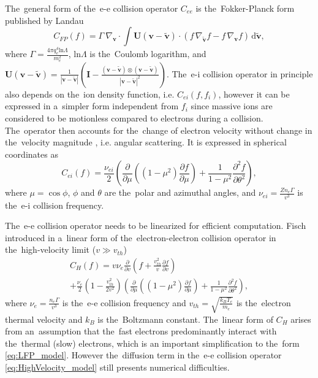 \documentclass[
 aps,
 jmp,
 amsmath,amssymb,
 twocolumn,
]{revtex4-1}
\newcommand{\pdv}[2]{\frac{\partial{#1}}{\partial{#2}}}
\newcommand{\vect}[1]{\boldsymbol{#1}}
\newcommand{\matr}[1]{\mathbf{#1}}
\newcommand{\dI}{\text{d}}
\newcommand{\Zbar}{Z}
\newcommand{\nue}{\nu_{e}}
\newcommand{\nuei}{\nu_{ei}}
\newcommand{\vmag}{v}
\newcommand{\vth}{v_{th}}
\newcommand{\qe}{q_e}
\newcommand{\me}{m_e}
\newcommand{\kB}{k_B}
\newcommand{\vv}{\vect{v}}
\newcommand{\vvb}{\tilde{\vect{v}}}
\newcommand{\gv}{\nabla_{\vv}}
\newcommand{\gvb}{\nabla_{\vvb}}
\newcommand{\ft}{f}
\newcommand{\lnc}{\text{ln}\Lambda}
\begin{document}
The~general form of the~e-e collision operator 
$C_{ee}$ is the~Fokker-Planck form published by Landau \cite{Landau_1936}
\begin{equation}
  C_{FP}(\ft) =
  \Gamma~\gv\cdot\int \matr{U}(\vv - \vvb) \cdot \left(
  \ft\, \gvb \ft - \ft\, \gv \ft \right)\, \dI\vvb ,
  \label{eq:LFP_model}
\end{equation}
where $\Gamma = \frac{4\pi\qe^4\lnc}{\me^2}$, $\lnc$ is the~Coulomb logarithm,
and $\matr{U}(\vv - \vvb) = \frac{1}{|\vv - \vvb|}\left(\matr{I} - \frac{(\vv - \vvb)\otimes (\vv - \vvb)}{|\vv - \vvb|^2}\right)$.
The~e-i collision operator in principle also depends 
on the~ion density function, i.e. $C_{ei}(\ft, \ft_i)$, however it 
can be expressed in a~simpler form independent from $\ft_i$
since massive ions are considered 
to be motionless compared to electrons during a collision. 
The~operator then accounts
for the~change of electron velocity without change in the~velocity magnitude
, i.e. angular scattering. 
It is expressed in spherical coordinates as
\begin{equation}
  C_{ei}(\ft) = \frac{\nuei}{2}
  \left(\pdv{}{\mu}\left((1 - \mu^2)\pdv{\ft}{\mu}\right)
  + \frac{1}{1 - \mu^2}\frac{\partial^2 \ft}{\partial\theta^2} \right) ,
  \label{eq:ei_scattering}
\end{equation}
where $\mu = \cos\phi$, $\phi$ and $\theta$ are the~polar and azimuthal 
angles, and $\nuei = \frac{\Zbar n_e \Gamma}{\vmag^3}$ is the~e-i
collision frequency.

The~e-e collision operator needs to be linearized for efficient computation.
Fisch introduced in \cite{Fisch_RMP1987} a~linear form of 
the~electron-electron collision operator  
in the~high-velocity limit ($\vmag\gg\vth$)
\begin{multline}
  C_{H}(\ft) = \vmag \nue \pdv{}{\vmag}\left(\ft + 
  \frac{\vth^2}{\vmag}\pdv{f}{\vmag}\right) \\
  + \frac{\nue}{2}\left( 1 - \frac{\vth^2}{2\vmag^2}\right) 
  \left(\pdv{}{\mu}\left((1 - \mu^2)\pdv{f}{\mu}\right)
  + \frac{1}{1-\mu^2}\frac{\partial^2f}{\partial\theta^2} \right)
  , \label{eq:HighVelocity_model}
\end{multline}
where $\nue = \frac{n_e \Gamma}{\vmag^3}$ is the~e-e collision 
frequency and $\vth = \sqrt{\frac{\kB T_e}{\me}}$ is the~electron thermal 
velocity and $\kB$ is the~Boltzmann constant.
The~linear form of $C_{H}$ arises from an~assumption that the~fast electrons 
predominantly interact with the~thermal (slow) electrons, 
which is an important simplification to the~form \eqref{eq:LFP_model}.
However the~diffusion term in the~e-e collision operator 
\eqref{eq:HighVelocity_model} still presents numerical difficulties.
\end{document}
